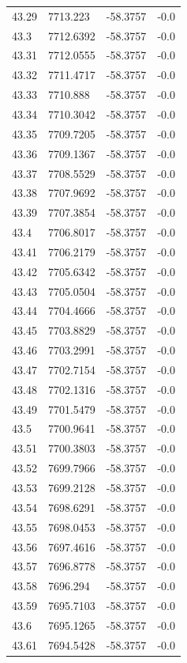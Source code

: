 \begin{table}[H]
\begin{tabular}{llll}
43.29 & 7713.223 & -58.3757 & -0.0 \\
43.3 & 7712.6392 & -58.3757 & -0.0 \\
43.31 & 7712.0555 & -58.3757 & -0.0 \\
43.32 & 7711.4717 & -58.3757 & -0.0 \\
43.33 & 7710.888 & -58.3757 & -0.0 \\
43.34 & 7710.3042 & -58.3757 & -0.0 \\
43.35 & 7709.7205 & -58.3757 & -0.0 \\
43.36 & 7709.1367 & -58.3757 & -0.0 \\
43.37 & 7708.5529 & -58.3757 & -0.0 \\
43.38 & 7707.9692 & -58.3757 & -0.0 \\
43.39 & 7707.3854 & -58.3757 & -0.0 \\
43.4 & 7706.8017 & -58.3757 & -0.0 \\
43.41 & 7706.2179 & -58.3757 & -0.0 \\
43.42 & 7705.6342 & -58.3757 & -0.0 \\
43.43 & 7705.0504 & -58.3757 & -0.0 \\
43.44 & 7704.4666 & -58.3757 & -0.0 \\
43.45 & 7703.8829 & -58.3757 & -0.0 \\
43.46 & 7703.2991 & -58.3757 & -0.0 \\
43.47 & 7702.7154 & -58.3757 & -0.0 \\
43.48 & 7702.1316 & -58.3757 & -0.0 \\
43.49 & 7701.5479 & -58.3757 & -0.0 \\
43.5 & 7700.9641 & -58.3757 & -0.0 \\
43.51 & 7700.3803 & -58.3757 & -0.0 \\
43.52 & 7699.7966 & -58.3757 & -0.0 \\
43.53 & 7699.2128 & -58.3757 & -0.0 \\
43.54 & 7698.6291 & -58.3757 & -0.0 \\
43.55 & 7698.0453 & -58.3757 & -0.0 \\
43.56 & 7697.4616 & -58.3757 & -0.0 \\
43.57 & 7696.8778 & -58.3757 & -0.0 \\
43.58 & 7696.294 & -58.3757 & -0.0 \\
43.59 & 7695.7103 & -58.3757 & -0.0 \\
43.6 & 7695.1265 & -58.3757 & -0.0 \\
43.61 & 7694.5428 & -58.3757 & -0.0 \\

\end{tabular}
\end{table}
